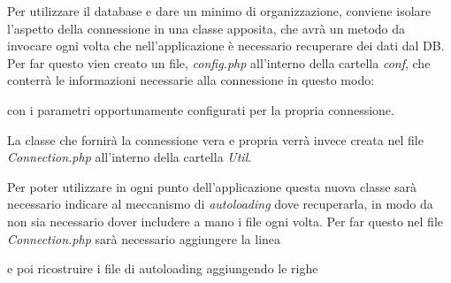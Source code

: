 Per utilizzare il database e dare un minimo di organizzazione, conviene
isolare l'aspetto della connessione in una classe apposita, che avrà un
metodo da invocare ogni volta che nell'applicazione è necessario
recuperare dei dati dal DB. Per far questo vien creato un file,
\emph{config.php} all'interno della cartella \emph{conf}, che conterrà
le informazioni necessarie alla connessione in questo modo:

\begin{Shaded}
\begin{Highlighting}[]
  \OperatorTok{=} \OtherTok{;}
  \OperatorTok{=} \OtherTok{;}
  \OperatorTok{=} \OtherTok{;}
  \OperatorTok{=} \OtherTok{;}
  \OperatorTok{=} \OtherTok{;}
\end{Highlighting}
\end{Shaded}

con i parametri opportunamente configurati per la propria connessione.

La classe che fornirà la connessione vera e propria verrà invece creata
nel file \emph{Connection.php} all'interno della cartella \emph{Util}.

Per poter utilizzare in ogni punto dell'applicazione questa nuova classe
sarà necessario indicare al meccanismo di \emph{autoloading} dove
recuperarla, in modo da non sia necessario dover includere a mano i file
ogni volta. Per far questo nel file \emph{Connection.php} sarà
necessario aggiungere la linea

\begin{Shaded}
\begin{Highlighting}[]
 \OtherTok{;}
\end{Highlighting}
\end{Shaded}

e poi ricostruire i file di autoloading aggiungendo le righe

\begin{Shaded}
\begin{Highlighting}[]
  \OtherTok{:}\NormalTok{ \{}
    \OtherTok{:}\NormalTok{ \{}
      \SpecialCharTok{\textbackslash{}\textbackslash{}} \OtherTok{:} 
\NormalTok{    \}}
\NormalTok{  \}}\OtherTok{,}
\end{Highlighting}
\end{Shaded}

